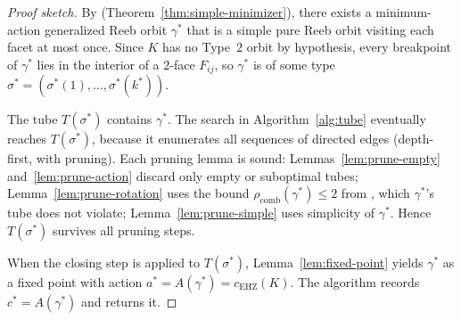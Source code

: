 \begin{proof}[Proof sketch]
By \cite{HK2017} (Theorem~\ref{thm:simple-minimizer}),
there exists a minimum-action generalized Reeb orbit $\gamma^*$
that is a simple pure Reeb orbit visiting each facet at most once.
Since $K$ has no Type~$2$ orbit by hypothesis,
every breakpoint of $\gamma^*$ lies in the interior of a $2$-face $F_{ij}$,
so $\gamma^*$ is of some type $\sigma^* = (\sigma^*(1), \ldots, \sigma^*(k^*))$.

The tube $T(\sigma^*)$ contains $\gamma^*$.
The search in Algorithm~\ref{alg:tube} eventually reaches $T(\sigma^*)$,
because it enumerates all sequences of directed edges
(depth-first, with pruning).
Each pruning lemma is sound:
Lemmas~\ref{lem:prune-empty} and~\ref{lem:prune-action} discard only empty
or suboptimal tubes;
Lemma~\ref{lem:prune-rotation} uses the bound
$\rho_{\mathrm{comb}}(\gamma^*) \leq 2$ from \cite[Cor.~1.15]{CH2021},
which $\gamma^*$'s tube does not violate;
Lemma~\ref{lem:prune-simple} uses simplicity of $\gamma^*$.
Hence $T(\sigma^*)$ survives all pruning steps.

When the closing step is applied to $T(\sigma^*)$,
Lemma~\ref{lem:fixed-point} yields $\gamma^*$ as a fixed point
with action $a^* = A(\gamma^*) = c_{\mathrm{EHZ}}(K)$.
The algorithm records $c^* = A(\gamma^*)$
and returns it.
\end{proof}

